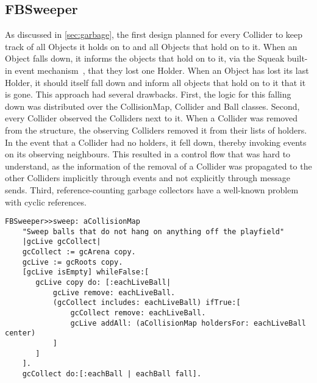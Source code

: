 \subsection{FBSweeper}
As discussed in \ref{sec:garbage}, the first design planned for every Collider to keep track of all Objects it holds on to and all Objects that hold on to it. When an Object falls down, it informs the objects that hold on to it, via the Squeak built-in event mechanism~\cite{website:squeakwikiObserver}, that they lost one Holder. When an Object has lost its last Holder, it should itself fall down and inform all objects that hold on to it that it is gone.
This approach had several drawbacks. First, the logic for this falling down was distributed over the CollisionMap, Collider and Ball classes.
Second, every Collider observed the Colliders next to it. When a Collider was removed from the structure, the observing Colliders removed it from their lists of holders. In the event that a Collider had no holders, it fell down, thereby invoking events on its observing neighbours.
This resulted in a control flow that was hard to understand, as the information of the removal of a Collider was propagated to the other Colliders implicitly through events and not explicitly through message sends.
Third, reference-counting garbage collectors have a well-known problem with cyclic references. 

\begin{lstlisting}[language=Smalltalk]
FBSweeper>>sweep: aCollisionMap
    "Sweep balls that do not hang on anything off the playfield"
    |gcLive gcCollect|
    gcCollect := gcArena copy.
    gcLive := gcRoots copy.
    [gcLive isEmpty] whileFalse:[
       gcLive copy do: [:eachLiveBall|
           gcLive remove: eachLiveBall.
           (gcCollect includes: eachLiveBall) ifTrue:[
               gcCollect remove: eachLiveBall.
               gcLive addAll: (aCollisionMap holdersFor: eachLiveBall center)
           ]
       ]
    ].
    gcCollect do:[:eachBall | eachBall fall].
\end{lstlisting}
